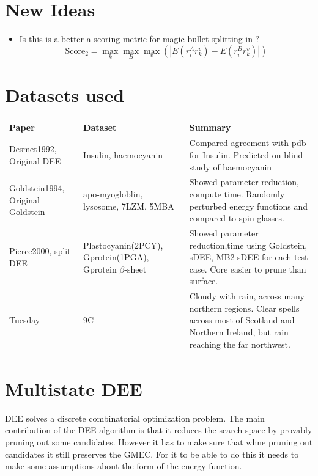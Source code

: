 \documentclass{article}
\begin{document}
\section{New Ideas}

\begin{itemize}
\item Is this is a better a scoring metric for magic bullet splitting in  \cite{Pierce2000} ? 
\[
\text{Score}_2 = \max_k \max_B \max_v \left( \left| E(r_i^Ar_k^v) - E(r_i^Br_k^v) \right| \right)
\]
\end{itemize}

\pagebreak
\newpage

\appendix


\section{Datasets used}


\begin{center}
    \begin{tabular}{ | p{3cm} | p{3cm} | p{6cm} |}
    \hline
    \textbf{Paper} & \textbf{Dataset} & \bf{Summary} \\ \hline
    Desmet1992, Original DEE~\cite{Desmet1992} & Insulin, haemocyanin & Compared agreement with pdb for Insulin. Predicted on blind study of haemocyanin \\ \hline
    Goldstein1994, Original Goldstein~\cite{Goldstein1994} & apo-myogloblin, lysosome, 7LZM, 5MBA& Showed parameter reduction, compute time. Randomly perturbed energy functions and compared to spin glasses. \\ \hline
Pierce2000, split DEE~\cite{Pierce2000} & Plastocyanin(2PCY), Gprotein(1PGA), Gprotein $\beta$-sheet& Showed parameter reduction,time using Goldstein, sDEE, MB2 sDEE for each test case. Core easier to prune than surface. \\ \hline
    Tuesday & 9C & Cloudy with rain, across many northern regions. Clear spells
    across most of Scotland and Northern Ireland,
    but rain reaching the far northwest. \\ 
    \hline
    \end{tabular}
\end{center}


\section{Multistate DEE}
DEE solves a discrete combinatorial optimization problem. The main contribution of the DEE algorithm is that it reduces the search space by provably pruning out some candidates. However it has to make sure that whne pruning out candidates it still preserves the GMEC. For it to be able to do this it needs to make some assumptions about the form of the energy function. 
\end{document}

